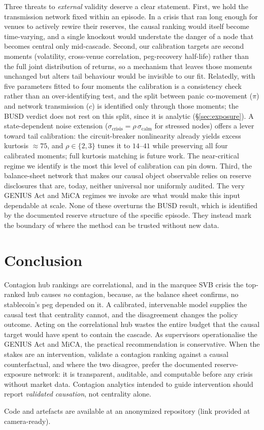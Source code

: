\documentclass[sigconf,anonymous]{acmart}
\begin{document}
Three threats to \emph{external} validity deserve a clear statement. First, we hold the transmission
network fixed within an episode. In a crisis that ran long enough for venues to actively rewire their
reserves, the causal ranking would itself become time-varying, and a single knockout would understate
the danger of a node that becomes central only mid-cascade. Second, our calibration targets are
second moments (volatility, cross-venue correlation, peg-recovery half-life) rather than the full
joint distribution of returns, so a mechanism that leaves those moments unchanged but alters tail
behaviour would be invisible to our fit. Relatedly, with five parameters fitted to four moments
the calibration is a consistency check rather than an over-identifying test, and the split
between panic co-movement ($\pi$) and network transmission ($c$) is identified only through
those moments; the BUSD verdict does not rest on this split, since it is analytic
(\S\ref{sec:exposure}). A state-dependent noise extension
($\sigma_{\mathrm{crisis}}=\rho\,\sigma_{\mathrm{calm}}$ for stressed nodes) offers a lever
toward tail calibration: the circuit-breaker nonlinearity already yields excess kurtosis
${\approx}75$, and $\rho\in\{2,3\}$ tunes it to $14$--$41$ while preserving all four calibrated
moments; full kurtosis matching is future work. The near-critical regime we identify is the most
this level of calibration can pin down. Third, the balance-sheet network that makes our causal object observable
relies on reserve disclosures that are, today, neither universal nor uniformly audited. The very
GENIUS Act and MiCA regimes we invoke are what would make this input dependable at scale. None of
these overturns the BUSD result, which is identified by the documented reserve structure of the
specific episode. They instead mark the boundary of where the method can be trusted without new data.

\section{Conclusion}
Contagion hub rankings are correlational, and in the marquee SVB crisis the top-ranked hub causes
\emph{no} contagion, because, as the balance sheet confirms, no stablecoin's peg depended on it. A
calibrated, intervenable model supplies the causal test that centrality cannot, and the disagreement
changes the policy outcome. Acting on the correlational hub wastes the entire budget that the causal
target would have spent to contain the cascade. As supervisors operationalise the GENIUS Act and MiCA,
the practical recommendation is conservative. When the stakes are an
intervention, validate a contagion ranking against a causal counterfactual, and where the two
disagree, prefer the documented reserve-exposure network: it is transparent, auditable, and
computable before any crisis without market data. Contagion analytics
intended to guide intervention should report \emph{validated causation}, not centrality alone.

\begin{acks}
Code and artefacts are available at an anonymized repository (link provided at camera-ready).
\end{acks}

{\footnotesize\setlength{\bibsep}{0pt plus 0.1ex}%
%
}
\end{document}
